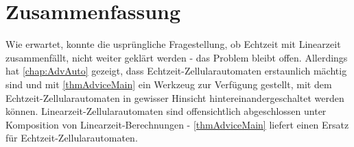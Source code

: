 \chapter{Zusammenfassung}

Wie erwartet, konnte die usprüngliche Fragestellung, ob Echtzeit mit Linearzeit zusammenfällt,
nicht weiter geklärt werden - das Problem bleibt offen.
Allerdings hat \ref{chap:AdvAuto} gezeigt, dass Echtzeit-Zellularautomaten erstaunlich mächtig sind
und mit \ref{thmAdviceMain} ein Werkzeug zur Verfügung gestellt, mit dem Echtzeit-Zellularautomaten
in gewisser Hinsicht hintereinandergeschaltet werden können.
Linearzeit-Zellularautomaten sind offensichtlich abgeschlossen unter Komposition von Linearzeit-Berechnungen -
\ref{thmAdviceMain} liefert einen Ersatz für Echtzeit-Zellularautomaten.



